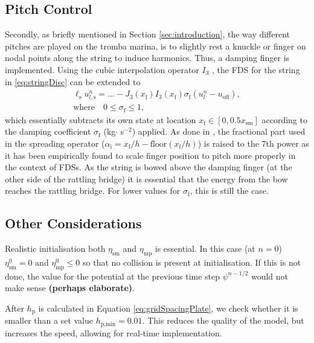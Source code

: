 \documentclass[dvipsnames, pdftex]{article}
\begin{document}
\subsection{Pitch Control}
Secondly, as briefly mentioned in Section \ref{sec:introduction}, the way different pitches are played on the tromba marina, is to slightly rest a knuckle or finger on nodal points along the string to induce harmonics. Thus, a damping finger is implemented. Using the cubic interpolation operator $I_3$ \cite{bilbao2009numerical}, the FDS for the string in \eqref{eq:stringDisc} can be extended to
\begin{gather}\label{eq:dampingFinger}
    \ell_\text{s} u_{l,\text{s}}^n = \hdots - J_3(x_\text{f})I_3(x_\text{f})\sigma_\text{f}(u^n_l-u_\text{off}),\\
   \text{where} \quad 0\leq \sigma_\text{f} \leq 1,\nonumber
\end{gather}
which essentially subtracts its own state at location $x_\text{f} \in [0,0.5x_\text{sm}]$ according to the damping coefficient $\sigma_\text{f}$ (kg$ \cdot$ s$^{-2}$) applied. As done in \cite{Willemsen2019:SMC2020}, the fractional part used in the spreading operator ($\alpha_\text{i} = x_\text{f}/h - \text{floor}(x_\text{f}/h)$) is raised to the 7th power as it has been empirically found to scale finger position to pitch more properly in the context of FDSs. As the string is bowed above the damping finger (at the other side of the rattling bridge) it is   essential that the energy from the bow reaches the rattling bridge. For lower values for $\sigma_\text{f}$, this is still the case.

\subsection{Other Considerations}
Realistic initialisation both $\eta_\text{sm}$ and $\eta_\text{mp}$ is essential. In this case (at $n=0$) $\eta_\text{sm}^0 = 0$ and $\eta_\text{mp}^0 \leq 0$ so that no collision is present at initialisation. If this is not done, the value for the potential at the previous time step $\psi^{n-1/2}$ would not make sense \textbf{(perhaps elaborate)}.

After $h_\text{p}$ is calculated in Equation \eqref{eq:gridSpacingPlate}, we check whether it is smaller than a set value $h_{\text{p},\text{min}} = 0.01$. This reduces the quality of the model, but increases the speed, allowing for real-time implementation.
\end{document}
